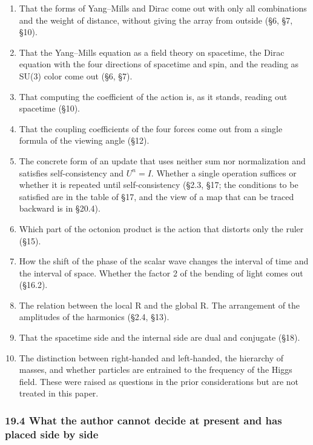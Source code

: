 \documentclass[
  a4paper,
]{article}
\providecommand{\tightlist}{%
  \setlength{\itemsep}{0pt}\setlength{\parskip}{0pt}}
\begin{document}
\begin{enumerate}
\def\labelenumi{\arabic{enumi}.}
\tightlist
\item
  That the forms of Yang--Mills and Dirac come out with only all
  combinations and the weight of distance, without giving the array from
  outside (§6, §7, §10).
\item
  That the Yang--Mills equation as a field theory on spacetime, the
  Dirac equation with the four directions of spacetime and spin, and the
  reading as SU(3) color come out (§6, §7).
\item
  That computing the coefficient of the action is, as it stands, reading
  out spacetime (§10).
\item
  That the coupling coefficients of the four forces come out from a
  single formula of the viewing angle (§12).
\item
  The concrete form of an update that uses neither sum nor normalization
  and satisfies self-consistency and \(U^n = I\). Whether a single
  operation suffices or whether it is repeated until self-consistency
  (§2.3, §17; the conditions to be satisfied are in the table of §17,
  and the view of a map that can be traced backward is in §20.4).
\item
  Which part of the octonion product is the action that distorts only
  the ruler (§15).
\item
  How the shift of the phase of the scalar wave changes the interval of
  time and the interval of space. Whether the factor 2 of the bending of
  light comes out (§16.2).
\item
  The relation between the local R and the global R. The arrangement of
  the amplitudes of the harmonics (§2.4, §13).
\item
  That the spacetime side and the internal side are dual and conjugate
  (§18).
\item
  The distinction between right-handed and left-handed, the hierarchy of
  masses, and whether particles are entrained to the frequency of the
  Higgs field. These were raised as questions in the prior
  considerations but are not treated in this paper.
\end{enumerate}

\subsubsection{19.4 What the author cannot decide at present and has
placed side by
side}\label{what-the-author-cannot-decide-at-present-and-has-placed-side-by-side}
\end{document}
